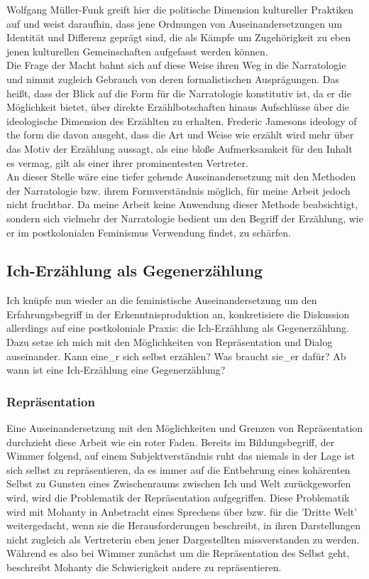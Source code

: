   Wolfgang Müller-Funk greift hier die politische Dimension kultureller
  Praktiken auf und weist daraufhin, dass jene Ordnungen von
  Auseinandersetzungen um Identität und Differenz geprägt sind, die als Kämpfe
  um Zugehörigkeit zu eben jenen kulturellen Gemeinschaften aufgefasst werden
  können. \\
  Die Frage der Macht bahnt sich auf diese Weise ihren Weg in die
  Narratologie und nimmt zugleich Gebrauch von deren formalistischen
  Ausprägungen. Das heißt, dass der Blick auf die Form für die Narratologie
  konstitutiv ist, da er die Möglichkeit bietet, über direkte Erzählbotschaften
  hinaus Aufschlüsse über die ideologische Dimension des Erzählten zu erhalten.
  Frederic Jamesons ideology of the form die davon ausgeht, dass die Art und
  Weise wie erzählt wird mehr über das Motiv der Erzählung aussagt, als eine
  bloße Aufmerksamkeit für den Inhalt es vermag, gilt als einer ihrer
  prominentesten Vertreter. 
  \\
  An dieser Stelle wäre eine tiefer gehende
  Auseinandersetzung mit den Methoden der Narratologie bzw. ihrem
  Formverständnis möglich, für meine Arbeit jedoch nicht fruchtbar. Da meine
  Arbeit keine Anwendung dieser Methode beabsichtigt, sondern sich vielmehr der
  Narratologie bedient um den Begriff der Erzählung, wie er im postkolonialen
  Feminismus Verwendung findet, zu schärfen.

  \subsection{Ich-Erzählung als Gegenerzählung}

  Ich knüpfe nun wieder an die feministische Auseinandersetzung um den
  Erfahrungsbegriff in der Erkenntnisproduktion an, konkretisiere die
  Diskussion allerdings auf eine postkoloniale Praxis: die Ich-Erzählung als
  Gegenerzählung. Dazu setze ich mich mit den Möglichkeiten von Repräsentation
  und Dialog auseinander. Kann eine\_r sich selbst erzählen? Was braucht sie\_er
  dafür? Ab wann ist eine Ich-Erzählung eine Gegenerzählung?

  \subsubsection{Repräsentation}

  Eine Auseinandersetzung mit den Möglichkeiten und Grenzen von Repräsentation
  durchzieht diese Arbeit wie ein roter Faden. Bereits im Bildungsbegriff, der
  Wimmer folgend, auf einem Subjektverständnis ruht das niemals in der Lage ist
  sich selbst zu repräsentieren, da es immer auf die Entbehrung eines
  kohärenten Selbst zu Gunsten eines Zwischenraums zwischen Ich und Welt
  zurückgeworfen wird, wird die Problematik der Repräsentation aufgegriffen.
  Diese Problematik wird mit  Mohanty in Anbetracht eines Sprechens über bzw.
  für die 'Dritte Welt' weitergedacht, wenn sie die Herausforderungen
  beschreibt, in ihren Darstellungen nicht zugleich als Vertreterin eben jener
  Dargestellten missverstanden zu werden. Während es also bei Wimmer zunächst
  um die Repräsentation des Selbst geht, beschreibt Mohanty die Schwierigkeit
  andere zu repräsentieren.
  \\
  
